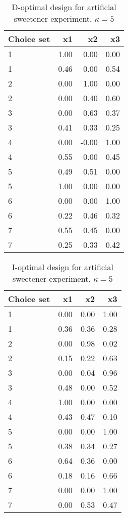 \begin{table}[ht]
\centering
\begin{tabular}{lrrr}
  \hline
Choice set & x1 & x2 & x3 \\ 
  \hline
1 & 1.00 & 0.00 & 0.00 \\ 
  1 & 0.46 & 0.00 & 0.54 \\ 
  2 & 0.00 & 1.00 & 0.00 \\ 
  2 & 0.00 & 0.40 & 0.60 \\ 
  3 & 0.00 & 0.63 & 0.37 \\ 
  3 & 0.41 & 0.33 & 0.25 \\ 
  4 & 0.00 & -0.00 & 1.00 \\ 
  4 & 0.55 & 0.00 & 0.45 \\ 
  5 & 0.49 & 0.51 & 0.00 \\ 
  5 & 1.00 & 0.00 & 0.00 \\ 
  6 & 0.00 & 0.00 & 1.00 \\ 
  6 & 0.22 & 0.46 & 0.32 \\ 
  7 & 0.55 & 0.45 & 0.00 \\ 
  7 & 0.25 & 0.33 & 0.42 \\ 
   \hline
\end{tabular}
\caption{D-optimal design for artificial sweetener experiment, $\kappa = 5$} 
\label{tab:cornell_exp_d_optimal_des_kappa_5}
\end{table}
\begin{table}[ht]
\centering
\begin{tabular}{lrrr}
  \hline
Choice set & x1 & x2 & x3 \\ 
  \hline
1 & 0.00 & 0.00 & 1.00 \\ 
  1 & 0.36 & 0.36 & 0.28 \\ 
  2 & 0.00 & 0.98 & 0.02 \\ 
  2 & 0.15 & 0.22 & 0.63 \\ 
  3 & 0.00 & 0.04 & 0.96 \\ 
  3 & 0.48 & 0.00 & 0.52 \\ 
  4 & 1.00 & 0.00 & 0.00 \\ 
  4 & 0.43 & 0.47 & 0.10 \\ 
  5 & 0.00 & 0.00 & 1.00 \\ 
  5 & 0.38 & 0.34 & 0.27 \\ 
  6 & 0.64 & 0.36 & 0.00 \\ 
  6 & 0.18 & 0.16 & 0.66 \\ 
  7 & 0.00 & 0.00 & 1.00 \\ 
  7 & 0.00 & 0.53 & 0.47 \\ 
   \hline
\end{tabular}
\caption{I-optimal design for artificial sweetener experiment, $\kappa = 5$} 
\label{tab:cornell_exp_i_optimal_des_kappa_5}
\end{table}

